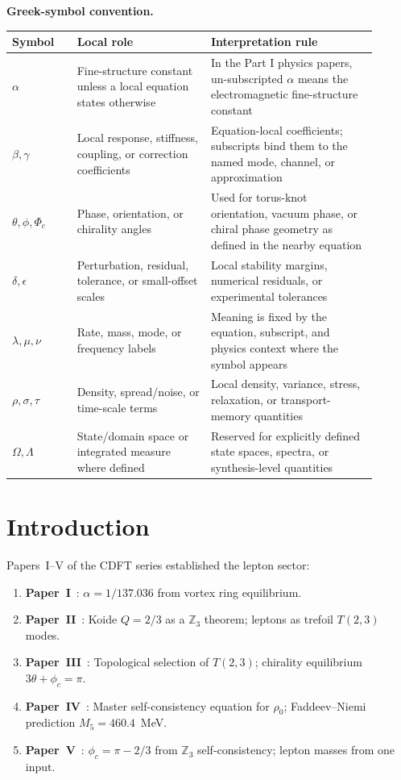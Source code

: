 \documentclass[11pt]{article}
\begin{document}
\noindent\textbf{Greek-symbol convention.}
\begin{center}
{\small
\begin{tabular}{p{0.16\linewidth}p{0.33\linewidth}p{0.41\linewidth}}
\hline
Symbol & Local role & Interpretation rule \\
\hline
$\alpha$ & Fine-structure constant unless a local equation states otherwise & In the Part I physics papers, un-subscripted $\alpha$ means the electromagnetic fine-structure constant \\
$\beta,\gamma$ & Local response, stiffness, coupling, or correction coefficients & Equation-local coefficients; subscripts bind them to the named mode, channel, or approximation \\
$\theta,\phi,\Phi_c$ & Phase, orientation, or chirality angles & Used for torus-knot orientation, vacuum phase, or chiral phase geometry as defined in the nearby equation \\
$\delta,\epsilon$ & Perturbation, residual, tolerance, or small-offset scales & Local stability margins, numerical residuals, or experimental tolerances \\
$\lambda,\mu,\nu$ & Rate, mass, mode, or frequency labels & Meaning is fixed by the equation, subscript, and physics context where the symbol appears \\
$\rho,\sigma,\tau$ & Density, spread/noise, or time-scale terms & Local density, variance, stress, relaxation, or transport-memory quantities \\
$\Omega,\Lambda$ & State/domain space or integrated measure where defined & Reserved for explicitly defined state spaces, spectra, or synthesis-level quantities \\
\hline
\end{tabular}
}
\end{center}


\section{Introduction}

Papers~I--V of the CDFT series established the lepton sector:
\begin{enumerate}
  \item \textbf{Paper~I}~\cite{MujjabiI2026}: $\alpha = 1/137.036$ from vortex ring equilibrium.
  \item \textbf{Paper~II}~\cite{MujjabiII2026}: Koide $Q = 2/3$ as a $\mathbb{Z}_3$ theorem;
    leptons as trefoil $T(2,3)$ modes.
  \item \textbf{Paper~III}~\cite{MujjabiIII2026}: Topological selection of $T(2,3)$;
    chirality equilibrium $3\theta + \phi_c = \pi$.
  \item \textbf{Paper~IV}~\cite{MujjabiIV2026}: Master self-consistency equation for $\rho_0$;
    Faddeev--Niemi prediction $M_5 = 460.4$~MeV.
  \item \textbf{Paper~V}~\cite{MujjabiV2026}: $\phi_c = \pi - 2/3$ from $\mathbb{Z}_3$
    self-consistency; lepton masses from one input.
\end{enumerate}
\end{document}
